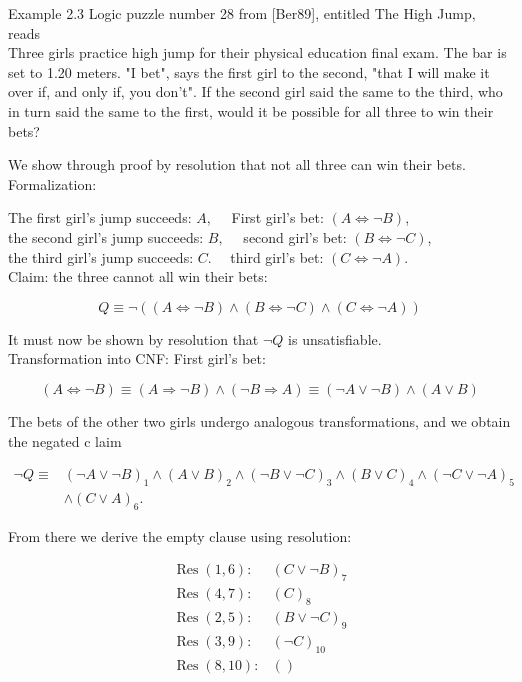 \documentclass[10pt]{article}
\begin{document}
Example 2.3 Logic puzzle number 28 from [Ber89], entitled The High Jump, reads\\
Three girls practice high jump for their physical education final exam. The bar is set to 1.20 meters. "I bet", says the first girl to the second, "that I will make it over if, and only if, you don't". If the second girl said the same to the third, who in turn said the same to the first, would it be possible for all three to win their bets?

We show through proof by resolution that not all three can win their bets.\\
Formalization:

The first girl's jump succeeds: $A, \quad$ First girl's bet: $(A \Leftrightarrow \neg B)$,\\
the second girl's jump succeeds: $B, \quad$ second girl's bet: $(B \Leftrightarrow \neg C)$,\\
the third girl's jump succeeds: $C . \quad$ third girl's bet: $(C \Leftrightarrow \neg A)$.\\
Claim: the three cannot all win their bets:

$$
Q \equiv \neg((A \Leftrightarrow \neg B) \wedge(B \Leftrightarrow \neg C) \wedge(C \Leftrightarrow \neg A))
$$

It must now be shown by resolution that $\neg Q$ is unsatisfiable.\\
Transformation into CNF: First girl's bet:

$$
(A \Leftrightarrow \neg B) \equiv(A \Rightarrow \neg B) \wedge(\neg B \Rightarrow A) \equiv(\neg A \vee \neg B) \wedge(A \vee B)
$$

The bets of the other two girls undergo analogous transformations, and we obtain the negated c
laim

$$
\begin{aligned}
\neg Q \equiv & (\neg A \vee \neg B)_{1} \wedge(A \vee B)_{2} \wedge(\neg B \vee \neg C)_{3} \wedge(B \vee C)_{4} \wedge(\neg C \vee \neg A)_{5} \\
& \wedge(C \vee A)_{6} .
\end{aligned}
$$

From there we derive the empty clause using resolution:

$$
\begin{array}{ll}
\operatorname{Res}(1,6): & (C \vee \neg B)_{7} \\
\operatorname{Res}(4,7): & (C)_{8} \\
\operatorname{Res}(2,5): & (B \vee \neg C)_{9} \\
\operatorname{Res}(3,9): & (\neg C)_{10} \\
\operatorname{Res}(8,10): & ()
\end{array}
$$
\end{document}
